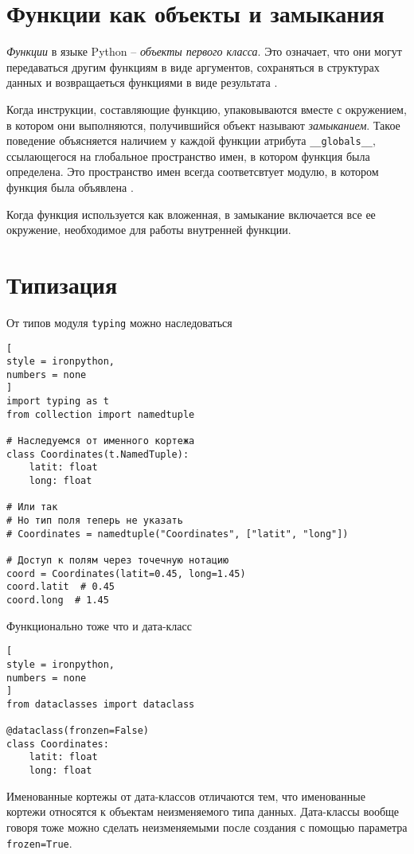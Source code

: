 \documentclass[%
	11pt,
	a4paper,
	utf8,
		]{article}
\begin{document}
\section{Функции как объекты и замыкания}

\emph{Функции} в языке Python -- \emph{объекты первого класса}. Это означает, что они могут передаваться другим функциям в виде аргументов, сохраняться в структурах данных и возвращаеться функциями в виде результата \cite[]{beazley:python-2010}.

Когда инструкции, составляющие функцию, упаковываются вместе с окружением, в котором они выполняются, получившийся объект называют \emph{замыканием}. Такое поведение объясняется наличием у каждой функции атрибута \verb|__globals__|, ссылающегося на глобальное пространство имен, в котором функция была определена. Это пространство имен всегда соответсвтует модулю, в котором функция была объявлена \cite[]{beazley:python-2010}.

Когда функция используется как вложенная, в замыкание включается все ее окружение, необходимое для работы внутренней функции.

\section{Типизация}

От типов модуля \texttt{typing} можно наследоваться
\begin{lstlisting}[
style = ironpython,
numbers = none	
]
import typing as t
from collection import namedtuple

# Наследуемся от именного кортежа
class Coordinates(t.NamedTuple):
    latit: float
    long: float
    
# Или так
# Но тип поля теперь не указать
# Coordinates = namedtuple("Coordinates", ["latit", "long"])

# Доступ к полям через точечную нотацию
coord = Coordinates(latit=0.45, long=1.45)
coord.latit  # 0.45
coord.long  # 1.45
\end{lstlisting}

Функционально тоже что и дата-класс
\begin{lstlisting}[
style = ironpython,
numbers = none
]
from dataclasses import dataclass

@dataclass(fronzen=False)
class Coordinates:
    latit: float
    long: float
\end{lstlisting}

Именованные кортежы от дата-классов отличаются тем, что именованные кортежи относятся к объектам неизменяемого типа данных. Дата-классы вообще говоря тоже можно сделать неизменяемыми после создания с помощью параметра \verb|frozen=True|.
\end{document}
